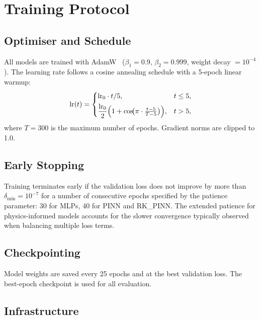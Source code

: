 \documentclass[a4paper,11pt]{article}
\begin{document}
\section{Training Protocol}
\label{sec:training}

\subsection{Optimiser and Schedule}

All models are trained with AdamW~\cite{AdamW}
($\beta_1 = 0.9$, $\beta_2 = 0.999$, weight decay $= 10^{-4}$).  The
learning rate follows a cosine annealing schedule with a 5-epoch linear
warmup:
\begin{equation}
  \text{lr}(t) =
  \begin{cases}
    \text{lr}_0 \cdot t / 5, & t \leq 5, \\[4pt]
    \dfrac{\text{lr}_0}{2}
    \Bigl(1 + \cos\!\bigl(\pi \cdot \tfrac{t - 5}{T - 5}\bigr)\Bigr),
    & t > 5,
  \end{cases}
  \label{eq:schedule}
\end{equation}
where $T = 300$ is the maximum number of epochs.  Gradient norms are
clipped to 1.0.

\subsection{Early Stopping}

Training terminates early if the validation loss does not improve by more
than $\delta_\text{min} = 10^{-7}$ for a number of consecutive epochs
specified by the patience parameter: 30 for MLPs, 40 for PINN and
RK\_PINN.  The extended patience for physics-informed models accounts for
the slower convergence typically observed when balancing multiple loss
terms.

\subsection{Checkpointing}

Model weights are saved every 25 epochs and at the best validation loss.
The best-epoch checkpoint is used for all evaluation.

\subsection{Infrastructure}
\end{document}

